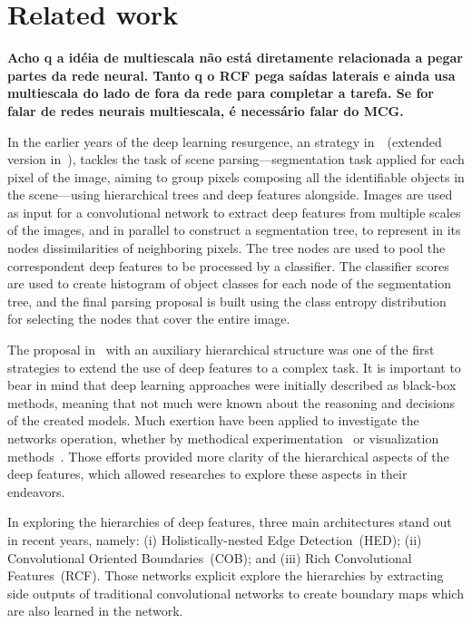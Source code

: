 \section{Related work}
\label{sec:related}

\textbf{Acho q a idéia de multiescala não está diretamente relacionada a pegar partes da rede neural. Tanto q o RCF pega saídas laterais e ainda usa multiescala do lado de fora da rede para completar a tarefa. Se for falar de redes neurais multiescala, é necessário falar do MCG.}

In the earlier years of the deep learning resurgence, an strategy in~\cite{farabet2012}~(extended version in~\cite{farabet2013}), tackles the task of scene parsing---segmentation task applied for each pixel of the image, aiming to group pixels composing all the identifiable objects in the scene---using hierarchical trees and deep features alongside. Images are used as input for a convolutional network to extract deep features from multiple scales of the images, and in parallel to construct a segmentation tree, to represent in its nodes dissimilarities of neighboring pixels. The tree nodes are used to pool the correspondent deep features to be processed by a classifier. The classifier scores are used to create histogram of object classes for each node of the segmentation tree, and the final parsing proposal is built using the class entropy distribution for selecting the nodes that cover the entire image.   

The proposal in~\cite{farabet2012} with an auxiliary hierarchical structure was one of the first strategies to extend the use of deep features to a complex task. It is important to bear in mind that deep learning approaches were initially described as black-box methods, meaning that not much were known about the reasoning and decisions of the created models. Much exertion have been applied to investigate the networks operation, whether by methodical experimentation~\cite{ilin17,kuo16,eigen14,zhang17} or visualization methods~\cite{simonyan13,zeiler14,alsallakh18}. Those efforts provided more clarity of the hierarchical aspects of the deep features, which allowed researches to explore these aspects in their endeavors. 

In exploring the hierarchies of deep features, three main architectures stand out in recent years, namely: (i) Holistically-nested Edge Detection~(HED); (ii) Convolutional Oriented Boundaries~(COB); and (iii) Rich Convolutional Features~(RCF). Those networks explicit explore the hierarchies by extracting side outputs of traditional convolutional networks to create boundary maps which are also learned in the network.

